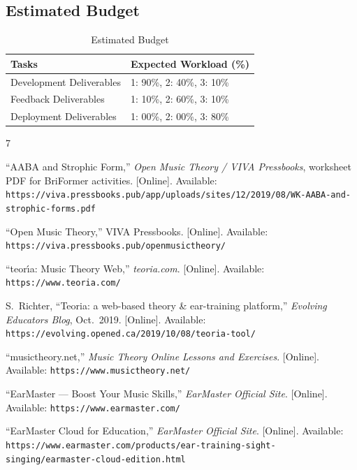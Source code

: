 \documentclass[12pt, letterpaper]{article}
\begin{document}
\subsection*{Estimated Budget}
\begin{table}[h!]
\caption{Estimated Budget}
\centering
\begin{tabular}{|p{6cm}|p{6cm}|}
\hline
\textbf{Tasks} & \textbf{Expected Workload (\%)} \\
\hline
Development Deliverables & 1: 90\%, 2: 40\%, 3: 10\% \\
\hline
Feedback Deliverables & 1: 10\%, 2: 60\%, 3: 10\% \\
\hline
Deployment Deliverables & 1: 00\%, 2: 00\%, 3: 80\%\\
\hline
\end{tabular}
\end{table}

\begin{thebibliography}{7}

``AABA and Strophic Form,'' \emph{Open Music Theory / VIVA Pressbooks}, worksheet PDF for BriFormer activities. [Online]. Available:
\texttt{https://viva.pressbooks.pub/app/uploads/sites/12/2019/08/WK-AABA-and-strophic-forms.pdf}

``Open Music Theory,'' VIVA Pressbooks. [Online]. Available:
\texttt{https://viva.pressbooks.pub/openmusictheory/}

``teor\'{\i}a: Music Theory Web,'' \emph{teoria.com}. [Online]. Available:
\texttt{https://www.teoria.com/}

S.~Richter, ``Teoria: a web-based theory \& ear-training platform,'' \emph{Evolving Educators Blog}, Oct.~2019. [Online]. Available:
\texttt{https://evolving.opened.ca/2019/10/08/teoria-tool/}

``musictheory.net,'' \emph{Music Theory Online Lessons and Exercises}. [Online]. Available:
\texttt{https://www.musictheory.net/}

``EarMaster --- Boost Your Music Skills,'' \emph{EarMaster Official Site}. [Online]. Available:
\texttt{https://www.earmaster.com/}

``EarMaster Cloud for Education,'' \emph{EarMaster Official Site}. [Online]. Available:
\texttt{https://www.earmaster.com/products/ear-training-sight-singing/earmaster-cloud-edition.html}

\end{thebibliography}
\end{document}
